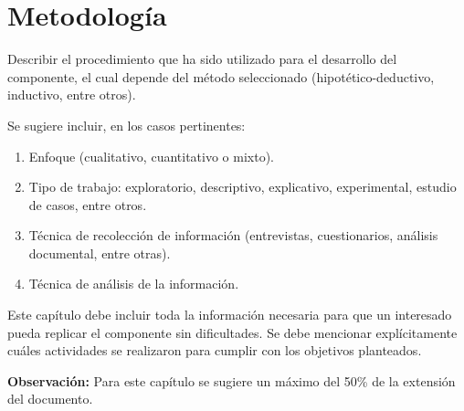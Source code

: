 \chapter{Metodología}

Describir el procedimiento que ha sido utilizado para el desarrollo del componente, el cual depende del método seleccionado (hipotético-deductivo, inductivo, entre otros).

Se sugiere incluir, en los casos pertinentes:
\begin{enumerate}
    \item Enfoque (cualitativo, cuantitativo o mixto).
    \item Tipo de trabajo: exploratorio, descriptivo, explicativo, experimental, estudio de casos, entre otros.
    \item Técnica de recolección de información (entrevistas, cuestionarios, análisis documental, entre otras).
    \item Técnica de análisis de la información.
\end{enumerate}

Este capítulo debe incluir toda la información necesaria para que un interesado pueda replicar el componente sin dificultades. Se debe mencionar explícitamente cuáles actividades se realizaron para cumplir con los objetivos planteados. 

\textbf{Observación:} Para este capítulo se sugiere un máximo del 50\% de la extensión del documento.